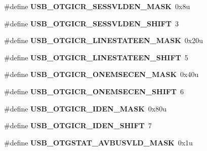 \begin{DoxyCompactItemize}
\#define {\bfseries U\+S\+B\+\_\+\+O\+T\+G\+I\+C\+R\+\_\+\+S\+E\+S\+S\+V\+L\+D\+E\+N\+\_\+\+M\+A\+SK}~0x8u
\item 
\mbox{\label{group___u_s_b___register___masks_ga6f1a0dd83404b56be4be006b113f68d8}} 
\#define {\bfseries U\+S\+B\+\_\+\+O\+T\+G\+I\+C\+R\+\_\+\+S\+E\+S\+S\+V\+L\+D\+E\+N\+\_\+\+S\+H\+I\+FT}~3
\item 
\mbox{\label{group___u_s_b___register___masks_gac9d12e9bdf0d60b52ea0b99c668630af}} 
\#define {\bfseries U\+S\+B\+\_\+\+O\+T\+G\+I\+C\+R\+\_\+\+L\+I\+N\+E\+S\+T\+A\+T\+E\+E\+N\+\_\+\+M\+A\+SK}~0x20u
\item 
\mbox{\label{group___u_s_b___register___masks_ga1824eae0010a884c2b3bd425cfa2b389}} 
\#define {\bfseries U\+S\+B\+\_\+\+O\+T\+G\+I\+C\+R\+\_\+\+L\+I\+N\+E\+S\+T\+A\+T\+E\+E\+N\+\_\+\+S\+H\+I\+FT}~5
\item 
\mbox{\label{group___u_s_b___register___masks_gac68531fd32d53520e1d1ccdd4cfae9ec}} 
\#define {\bfseries U\+S\+B\+\_\+\+O\+T\+G\+I\+C\+R\+\_\+\+O\+N\+E\+M\+S\+E\+C\+E\+N\+\_\+\+M\+A\+SK}~0x40u
\item 
\mbox{\label{group___u_s_b___register___masks_ga29ccacd7b79d6d2df3b8743ccd1c467f}} 
\#define {\bfseries U\+S\+B\+\_\+\+O\+T\+G\+I\+C\+R\+\_\+\+O\+N\+E\+M\+S\+E\+C\+E\+N\+\_\+\+S\+H\+I\+FT}~6
\item 
\mbox{\label{group___u_s_b___register___masks_gaa13997b88383cb1aec6f042ecdb94399}} 
\#define {\bfseries U\+S\+B\+\_\+\+O\+T\+G\+I\+C\+R\+\_\+\+I\+D\+E\+N\+\_\+\+M\+A\+SK}~0x80u
\item 
\mbox{\label{group___u_s_b___register___masks_ga36d7ef200033a393e023ab06808f7129}} 
\#define {\bfseries U\+S\+B\+\_\+\+O\+T\+G\+I\+C\+R\+\_\+\+I\+D\+E\+N\+\_\+\+S\+H\+I\+FT}~7
\item 
\mbox{\label{group___u_s_b___register___masks_gaad4e0319a6f42042472b52c8d1ec1c77}} 
\#define {\bfseries U\+S\+B\+\_\+\+O\+T\+G\+S\+T\+A\+T\+\_\+\+A\+V\+B\+U\+S\+V\+L\+D\+\_\+\+M\+A\+SK}~0x1u

\end{DoxyCompactItemize}
